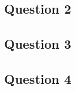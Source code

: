 \documentclass{article}
\begin{document}
\newpage\subsection*{Question 2}
\begin{resolution}
    
\end{resolution}

\newpage\subsection*{Question 3}
\begin{resolution}
    
\end{resolution}

\newpage\subsection*{Question 4}
\begin{resolution}
    
\end{resolution}
\end{document}
